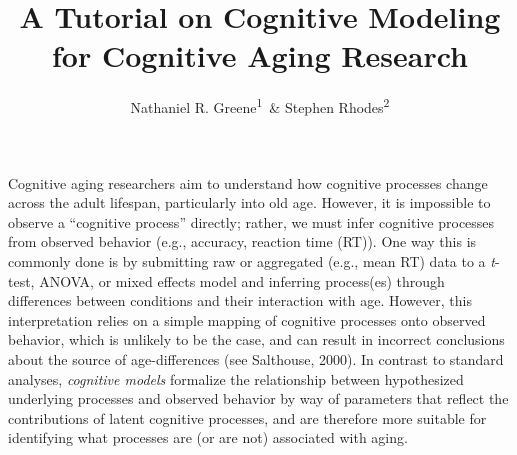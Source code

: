 \documentclass[
  english,
  ,man,floatsintext]{apa6}
\author{Nathaniel R. Greene\textsuperscript{1}\ \& Stephen Rhodes\textsuperscript{2}}
\affiliation{
\vspace{0.5cm}
\textsuperscript{1} University of Missouri\\\textsuperscript{2} Rotman Research Institute}
\title{A Tutorial on Cognitive Modeling for Cognitive Aging Research}
\date{}
\begin{document}
\maketitle

Cognitive aging researchers aim to understand how cognitive processes change across the adult lifespan, particularly into old age. However, it is impossible to observe a \enquote{cognitive process} directly; rather, we must infer cognitive processes from observed behavior (e.g., accuracy, reaction time (RT)). One way this is commonly done is by submitting raw or aggregated (e.g., mean RT) data to a \emph{t}-test, ANOVA, or mixed effects model and inferring process(es) through differences between conditions and their interaction with age. However, this interpretation relies on a simple mapping of cognitive processes onto observed behavior, which is unlikely to be the case, and can result in incorrect conclusions about the source of age-differences (see Salthouse, 2000). In contrast to standard analyses, \emph{cognitive models} formalize the relationship between hypothesized underlying processes and observed behavior by way of parameters that reflect the contributions of latent cognitive processes, and are therefore more suitable for identifying what processes are (or are not) associated with aging.
\end{document}
